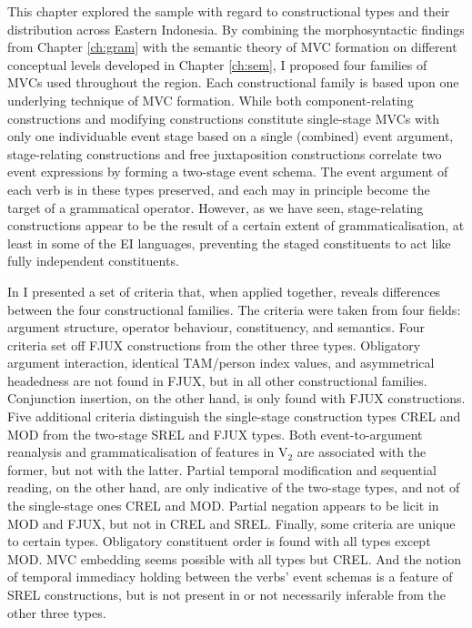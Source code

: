 This chapter explored the sample with regard to constructional types and their distribution across Eastern Indonesia. By combining the morphosyntactic findings from Chapter \ref{ch:gram} with the semantic theory of MVC formation on different conceptual levels developed in Chapter \ref{ch:sem}, I proposed four families of MVCs used throughout the region. Each constructional family is based upon one underlying technique of MVC formation. While both component-re\-lating constructions and modifying constructions constitute single-stage MVCs with only one individuable event stage based on a single (combined) event argument, stage-relating constructions and free juxtaposition constructions correlate two event expressions by forming a two-stage event schema. The event argument of each verb is in these types preserved, and each may in principle become the target of a grammatical operator. However, as we have seen, stage-relating constructions appear to be the result of a certain extent of grammaticalisation, at least in some of the EI languages, preventing the staged constituents to act like fully independent constituents. 

In  I presented a set of criteria that, when applied together, reveals differences between the four constructional families. The criteria were taken from four fields: argument structure, operator behaviour, constituency, and semantics. Four criteria set off FJUX constructions from the other three types. Obligatory argument interaction, identical TAM/person index values, and asymmetrical headedness are not found in FJUX, but in all other constructional families. Conjunction insertion, on the other hand, is only found with FJUX constructions. Five additional criteria distinguish the single-stage construction types CREL and MOD from the two-stage SREL and FJUX types. Both event-to-argument reanalysis and grammaticalisation of features in V$_2$ are associated with the former, but not with the latter. Partial temporal modification and sequential reading, on the other hand, are only indicative of the two-stage types, and not of the single-stage ones CREL and MOD. Partial negation appears to be licit in MOD and FJUX, but not in CREL and SREL. Finally, some criteria are unique to certain types. Obligatory constituent order is found with all types except MOD. MVC embedding seems possible with all types but CREL. And the notion of temporal immediacy holding between the verbs' event schemas is a feature of SREL constructions, but is not present in or not necessarily inferable from the other three types.

